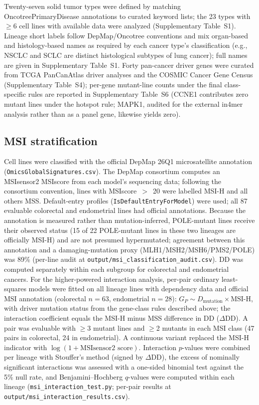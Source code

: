 \documentclass[11pt,a4paper]{article}
\begin{document}
Twenty-seven solid tumor types were defined by matching OncotreePrimaryDisease annotations to curated keyword lists; the 23 types with $\ge$6 cell lines with available data were analyzed (Supplementary Table~S1). Lineage short labels follow DepMap/Oncotree conventions and mix organ-based and histology-based names as required by each cancer type's classification (e.g., NSCLC and SCLC are distinct histological subtypes of lung cancer); full names are given in Supplementary Table~S1. Forty pan-cancer driver genes were curated from TCGA PanCanAtlas driver analyses \cite{Bailey2018} and the COSMIC Cancer Gene Census \cite{Sondka2018} (Supplementary Table~S4); per-gene mutant-line counts under the final class-specific rules are reported in Supplementary Table~S6 (CCNE1 contributes zero mutant lines under the hotspot rule; MAPK1, audited for the external in4mer analysis rather than as a panel gene, likewise yields zero).

\subsection*{MSI stratification}

Cell lines were classified with the official DepMap 26Q1 microsatellite annotation (\texttt{OmicsGlobalSignatures.csv}). The DepMap consortium computes an MSIsensor2 MSIscore from each model's sequencing data; following the consortium convention, lines with MSIscore~$>$~20 were labelled MSI-H and all others MSS. Default-entry profiles (\texttt{IsDefaultEntryForModel}) were used; all 87 evaluable colorectal and endometrial lines had official annotations. Because the annotation is measured rather than mutation-inferred, POLE-mutant lines receive their observed status (15 of 22 POLE-mutant lines in these two lineages are officially MSI-H) and are not presumed hypermutated; agreement between this annotation and a damaging-mutation proxy (MLH1/MSH2/MSH6/PMS2/POLE) was 89\% (per-line audit at \texttt{output/msi\_classification\_audit.csv}). DD was computed separately within each subgroup for colorectal and endometrial cancers. For the higher-powered interaction analysis, per-pair ordinary least-squares models were fitted on all lineage lines with dependency data and official MSI annotation (colorectal $n=63$, endometrial $n=28$): $G_P \sim D_{\text{mutation}} \times \text{MSI-H}$, with driver mutation status from the gene-class rules described above; the interaction coefficient equals the MSI-H minus MSS difference in DD ($\Delta$DD). A pair was evaluable with $\ge$3 mutant lines and $\ge$2 mutants in each MSI class (47 pairs in colorectal, 24 in endometrial). A continuous variant replaced the MSI-H indicator with $\log(1 + \text{MSIsensor2 score})$. Interaction $p$-values were combined per lineage with Stouffer's method (signed by $\Delta$DD), the excess of nominally significant interactions was assessed with a one-sided binomial test against the 5\% null rate, and Benjamini--Hochberg $q$-values were computed within each lineage (\texttt{msi\_interaction\_test.py}; per-pair results at \texttt{output/msi\_interaction\_results.csv}).
\end{document}
